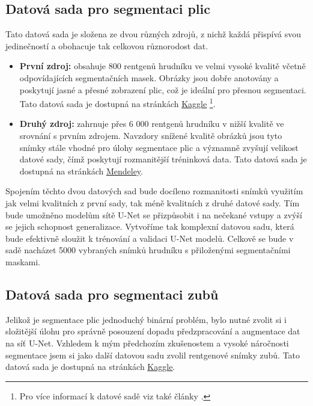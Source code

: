 \documentclass[male,czech,api_ing]{thesis}
\begin{document}
\subsection{Datová sada pro segmentaci plic}
Tato datová sada je složena ze dvou různých zdrojů, z nichž každá přispívá svou jedinečností a obohacuje tak celkovou různorodost dat.

\begin{itemize}
    \item \textbf{První zdroj:} obsahuje 800 rentgenů hrudníku ve velmi vysoké kvalitě včetně odpovídajících segmentačních masek. Obrázky jsou dobře anotovány a poskytují jasné a přesné zobrazení plic, což je ideální pro přesnou segmentaci. Tato datová sada je dostupná na stránkách \href{https://www.kaggle.com/datasets/nikhilpandey360/chest-xray-masks-and-labels}{Kaggle} \footnote{Pro více informací k datové sadě viz také články \cite{LungDatasetNeeded, LungDatasetNeeded2}.}.
    \item \textbf{Druhý zdroj:} zahrnuje přes 6 000 rentgenů hrudníku v nižší kvalitě ve srovnání s prvním zdrojem. Navzdory snížené kvalitě obrázků jsou tyto snímky stále vhodné pro úlohy segmentace plic a významně zvyšují velikost datové sady, čímž poskytují rozmanitější tréninková data. Tato datová sada je dostupná na stránkách \href{https://data.mendeley.com/datasets/8gf9vpkhgy/1}{Mendeley}. \cite{LungDataset2}
\end{itemize}

Spojením těchto dvou datových sad bude docíleno rozmanitosti snímků využitím jak velmi kvalitních z první sady, tak méně kvalitních z druhé datové sady. Tím bude umožněno modelům sítě U-Net se přizpůsobit i na nečekané vstupy a zvýší se jejich schopnost generalizace. Vytvoříme tak komplexní datovou sadu, která bude efektivně sloužit k trénování a validaci U-Net modelů. Celkově se bude v sadě nacházet 5000 vybraných snímků hrudníku s přiloženými segmentačními maskami.

\subsection{Datová sada pro segmentaci zubů}
Jelikož je segmentace plic jednoduchý binární problém, bylo nutné zvolit si i složitější úlohu pro správně posouzení dopadu předzpracování a augmentace dat na síť U-Net. Vzhledem k mým předchozím zkušenostem a vysoké náročnosti segmentace jsem si jako další datovou sadu zvolil rentgenové snímky zubů. Tato datová sada je dostupná na stránkách \href{https://www.kaggle.com/datasets/humansintheloop/teeth-segmentation-on-dental-x-ray-images}{Kaggle}. \cite{TeethDataset}
\end{document}
